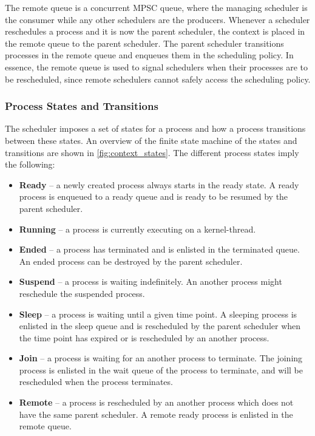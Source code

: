The remote queue is a concurrent MPSC queue, where the managing scheduler is the consumer while any other schedulers are the producers. Whenever a scheduler reschedules a process and it is now the parent scheduler, the context is placed in the remote queue to the parent scheduler. The parent scheduler transitions processes in the remote queue and enqueues them in the scheduling policy. In essence, the remote queue is used to signal schedulers when their processes are to be rescheduled, since remote schedulers cannot safely access the scheduling policy.


\subsubsection{Process States and Transitions}


The scheduler imposes a set of states for a process and how a process transitions between these states. An overview of the finite state machine of the states and transitions are shown in \cref{fig:context_states}. The different process states imply the following:

\begin{itemize}[topsep=0em,itemsep=-1em,partopsep=0.5em,parsep=1em]
    \item \textbf{Ready} -- a newly created process always starts in the ready state. A ready process is enqueued to a ready queue and is ready to be resumed by the parent scheduler.
    \item \textbf{Running} -- a process is currently executing on a kernel\hyp{}thread.
    \item \textbf{Ended} -- a process has terminated and is enlisted in the terminated queue. An ended process can be destroyed by the parent scheduler.
    \item \textbf{Suspend} -- a process is waiting indefinitely. An another process might reschedule the suspended process.
    \item \textbf{Sleep} -- a process is waiting until a given time point. A sleeping process is enlisted in the sleep queue and is rescheduled by the parent scheduler when the time point has expired or is rescheduled by an another process.
    \item \textbf{Join} -- a process is waiting for an another process to terminate. The joining process is enlisted in the wait queue of the process to terminate, and will be rescheduled when the process terminates.
    \item \textbf{Remote} -- a process is rescheduled by an another process which does not have the same parent scheduler. A remote ready process is enlisted in the remote queue.
\end{itemize}

